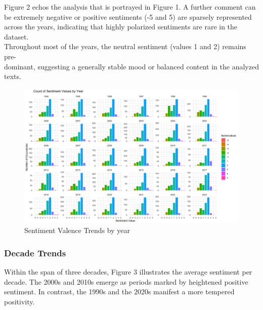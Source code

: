 \documentclass[
  letterpaper,
  DIV=11,
  numbers=noendperiod]{scrartcl}
\begin{document}
Figure 2 echos the analysis that is portrayed in Figure 1. A further
comment can\\
be extremely negative or positive sentiments (-5 and 5) are sparsely
represented\\
across the years, indicating that highly polarized sentiments are rare
in the dataset.\\
Throughout most of the years, the neutral sentiment (values 1 and 2)
remains pre-\\
dominant, suggesting a generally stable mood or balanced content in the
analyzed\\
texts.

\begin{figure}

{\centering \includegraphics{docs/Count_Sentiment_Values_by_Year.png}

}

\caption{Sentiment Valence Trends by year}

\end{figure}

\hypertarget{decade-trends}{%
\subsubsection{Decade Trends}\label{decade-trends}}

Within the span of three decades, Figure 3 illustrates the average
sentiment per\\
decade. The 2000s and 2010s emerge as periods marked by heightened
positive\\
sentiment. In contrast, the 1990s and the 2020s manifest a more tempered
positivity.\\
\end{document}
